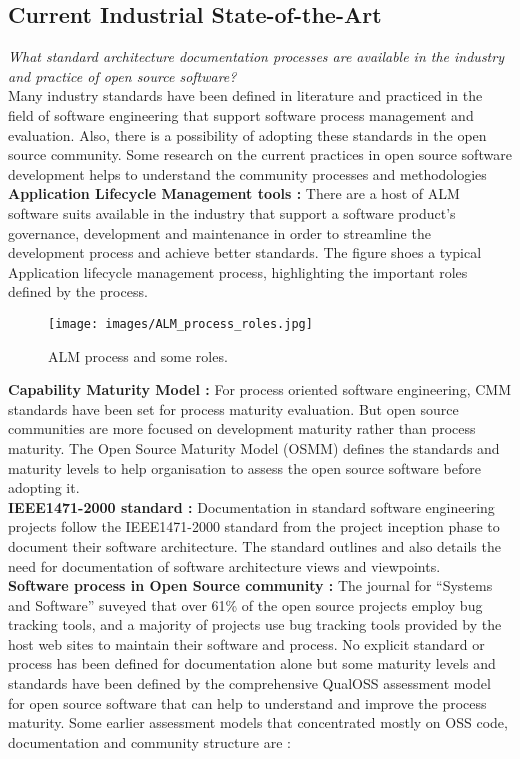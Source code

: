 \subsection{Current Industrial State-of-the-Art}
\indent \emph{What standard architecture documentation processes are available in the industry and practice of open source software?}
\\\indent Many industry standards have been defined in literature and practiced in the field of software engineering that support software process management and evaluation. Also, there is a possibility of adopting these standards in the open source community. Some research on the current practices in open source software development helps to understand the community processes and methodologies
\newline
\\\indent \textbf{Application Lifecycle Management tools : }  There are a host of ALM software suits available in the industry that support a software product's governance, development and maintenance in order to streamline the development process and achieve better standards. The figure shoes a typical Application lifecycle management process, highlighting the important roles defined by the process.
\begin{figure}[H]
  \centering
  \texttt{[image: images/ALM\_process\_roles.jpg]}
  \caption[ALM process and roles \cite{ALM2009}]{ALM process and some roles.}\label{fig:ALM_process_roles}
\end{figure} 
\indent \textbf{Capability Maturity Model : }  For process oriented software engineering, CMM standards \cite{SCAMPITeam2013} have been set for process maturity evaluation. But open source communities are more focused on development maturity rather than process maturity. The Open Source Maturity Model (OSMM) \cite{Duijnhouwer2003} defines the standards and maturity levels to help organisation to assess the open source software before adopting it.
\newline
\\\indent \textbf{IEEE1471-2000 standard : }Documentation in standard software engineering projects follow the IEEE1471-2000 standard \cite{BachmannDocumentingSoftware2010} from the project inception phase to document their software architecture. The standard outlines and also details the need for documentation of software architecture views and viewpoints.
\newline
\\\indent \textbf{Software process in Open Source community : } The journal for \enquote{Systems and Software} \cite{Zhao2003} suveyed that over 61\% of the open source projects employ bug tracking tools, and a majority of projects use bug tracking tools provided by the host web sites to maintain their software and process. No explicit standard or process has been defined for documentation alone but some maturity levels and standards have been defined by the comprehensive QualOSS assessment model \cite{5314237}for open source software that can help to understand and improve the process maturity. Some earlier assessment models that concentrated mostly on OSS code, documentation and community structure are :
